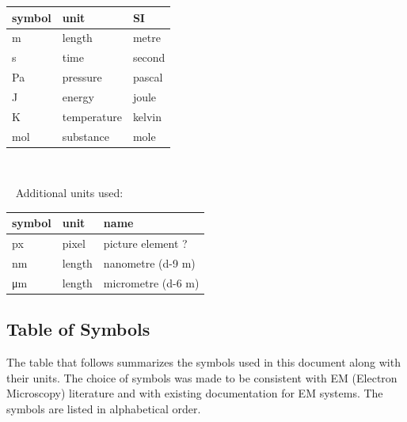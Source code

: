 \documentclass[12pt]{article}
\begin{document}
\renewcommand{\arraystretch}{1.2}
  \noindent \begin{tabular}{l l l} 
    \toprule		
    \textbf{symbol} & \textbf{unit} & \textbf{SI}\\
    \midrule 
    \si{\metre} & length & metre\\
    \si{\second} & time & second\\
    \si{Pa} & pressure & pascal\\
    \si{J} & energy & joule\\
    \si{K} & temperature & kelvin\\
    \si{mol} & substance & mole\\
    \bottomrule
  \end{tabular}
~\newline
 
~\newline
Additional units used:
~\newline

  \noindent \begin{tabular}{l l l} 
    \toprule		
    \textbf{symbol} & \textbf{unit} & \textbf{name}\\
    \midrule
    px & pixel & picture element ?\\
    \si{\nm} & length & nanometre (\num{d-9} m)\\
    \si{\um} & length & micrometre (\num{d-6} m)\\
    \bottomrule
  \end{tabular}

\subsection{Table of Symbols}

The table that follows summarizes the symbols used in this document along with
their units.  The choice of symbols was made to be consistent with EM (Electron
Microscopy) literature and with existing documentation for EM systems. 
The symbols are listed in alphabetical order.
\end{document}
